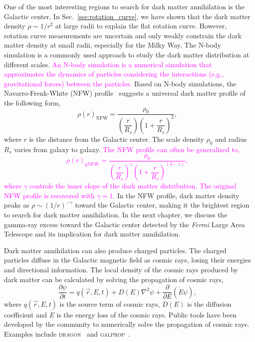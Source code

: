 \documentclass[doublespace,nopageskip]{VTthesis} %
\newcommand{\DS}[1]{\textcolor{magenta}{#1}}
\begin{document}
One of the most interesting regions to search for dark matter annihilation is the Galactic center. In Sec.~\ref{sse:rotation_curve}, we have shown that the dark matter density $\rho \sim 1/r^2$ at large radii to explain the flat rotation curve. However, rotation curve measurements are uncertain and only weakly constrain the dark matter density at small radii, especially for the Milky Way. The N-body simulation is a commonly used approach to study the dark matter distribution at different scales. 
\DS{An N-body simulation is a numerical simulation that approximates the dynamics of particles considering the interactions (e.g., gravitational forces) between the particles.}
Based on N-body simulations, the Navarro-Frenk-White (NFW) profile~\cite{1996ApJ...462..563N} suggests a universal dark matter profile of the following form,
\begin{equation}
    \rho(r)_\mathrm{NFW} = \frac{\rho_0}{\left(\dfrac{r}{R_s}\right)\left(1+\dfrac{r}{R_s}\right)^{2}},
\end{equation}
where $r$ is the distance from the Galactic center. The scale density $\rho_0$ and radius $R_s$ varies from galaxy to galaxy.
\DS{
The NFW profile can often be generalized to,
\begin{equation}
  \rho(r)_\mathrm{gNFW} = \dfrac{\rho_0}{\left(\dfrac{r}{R_s}\right)^\gamma\left(1+\dfrac{r}{R_s}\right)^{(3-\gamma)}},
\end{equation}
where $\gamma$ controls the inner slope of the dark matter distribution. The original NFW profile is recovered with $\gamma=1$.
}
In the NFW profile, dark matter density peaks as $\rho \sim (1/r)^{-\gamma}$ toward the Galactic center, making it the brightest region to search for dark matter annihilation. In the next chapter, we discuss the gamma-ray excess toward the Galactic center detected by the \textit{Fermi} Large Area Telescope and its implication for dark matter annihilation.

Dark matter annihilation can also produce charged particles. The charged particles diffuse in the Galactic magnetic field as cosmic rays, losing their energies and directional information. The local density of the cosmic rays produced by dark matter can be calculated by solving the propagation of cosmic rays,
\begin{equation}
    \frac{\partial\psi}{\partial t} = q(\vec{r},E,t) + D(E)\nabla^2\psi + \frac{\partial}{\partial E}(\dot{E}\psi),
\end{equation}
where $q(\vec{r},E,t)$ is the source term of cosmic rays, $D(E)$ is the diffusion coefficient and $\dot{E}$ is the energy loss of the cosmic rays. Public tools have been developed by the community to numerically solve the propagation of cosmic rays. Examples include \textsc{dragon}~\cite{2010APh....34..274D} and \textsc{galprop}~\cite{1998ApJ...509..212S}.
\end{document}
